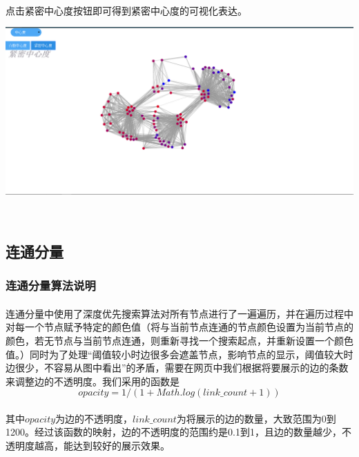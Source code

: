\documentclass{article}
\begin{document}
\begin{CJK}{UTF8}{gkai}
			\paragraph{}
			点击紧密中心度按钮即可得到紧密中心度的可视化表达。		
		\\[\intextsep] 
		\begin{minipage}{\textwidth} 
		    \centering 
		    \includegraphics[width=0.9\linewidth]{cc.PNG}
		\end{minipage} 
		\\[\intextsep] 

	\subsection{连通分量}
		\subsubsection{连通分量算法说明} %
			\paragraph{}
			连通分量中使用了深度优先搜索算法对所有节点进行了一遍遍历，并在遍历过程中对每一个节点赋予特定的颜色值（将与当前节点连通的节点颜色设置为当前节点的颜色，若无节点与当前节点连通，则重新寻找一个搜索起点，并重新设置一个颜色值。）同时为了处理“阈值较小时边很多会遮盖节点，影响节点的显示，阈值较大时边很少，不容易从图中看出”的矛盾，需要在网页中我们根据将要展示的边的条数来调整边的不透明度。我们采用的函数是
			 $$opacity = 1 / (1 + Math.log(link\_count + 1))$$
			\paragraph{}
			 其中$opacity$为边的不透明度，$link\_count$为将展示的边的数量，大致范围为0到1200。经过该函数的映射，边的不透明度的范围约是0.1到1，且边的数量越少，不透明度越高，能达到较好的展示效果。

\end{CJK}
\end{document}
